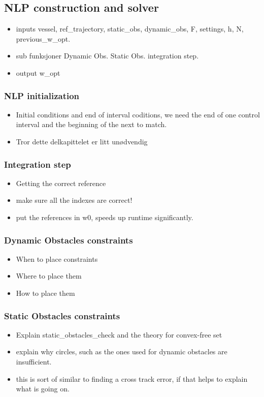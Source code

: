 \subsection{NLP construction and solver}
\begin{itemize}
    \item inputs\: vessel, ref\_trajectory, static\_obs, dynamic\_obs, F, settings, h, N, previous\_w\_opt.
    \item sub funksjoner\:
    \subitem Dynamic Obs.
    \subitem Static Obs.
    \subitem integration step.
    \item output\: w\_opt
\end{itemize}

\subsubsection{NLP initialization}
\begin{itemize}
    \item Initial conditions and end of interval coditions, we need the end of one control interval and the beginning of the next to match.
    \item Tror dette delkapittelet er litt unødvendig
\end{itemize}

\subsubsection{Integration step}
\begin{itemize}
    \item Getting the correct reference
    \item make sure all the indexes are correct!
    \item put the references in w0, speeds up runtime significantly.
\end{itemize}

\subsubsection{Dynamic Obstacles constraints}
\begin{itemize}
    \item When to place constraints
    \item Where to place them
    \item How to place them
\end{itemize}

\subsubsection{Static Obstacles constraints}
\begin{itemize}
    \item Explain static\_obstacles\_check and the theory for convex-free set
    \item explain why circles, such as the ones used for dynamic obstacles are insufficient.
    \item this is sort of similar to finding a cross track error, if that helps to explain what is going on.
\end{itemize}


